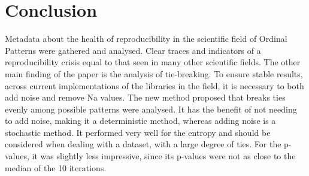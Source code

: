 \chapter{Conclusion}
Metadata about the health of reproducibility in the scientific field of Ordinal Patterns were gathered and analysed. Clear traces and indicators of a reproducibility crisis equal to that seen in many other scientific fields. The other main finding of the paper is the analysis of tie-breaking. To ensure stable results, across current implementations of the libraries in the field, it is necessary to both add noise and remove Na values. The new method proposed that breaks ties evenly among possible patterns were analysed. It has the benefit of not needing to add noise, making it a deterministic method, whereas adding noise is a stochastic method. It performed very well for the entropy and should be considered when dealing with a dataset, with a large degree of ties. For the p-values, it was slightly less impressive, since its p-values were not as close to the median of the 10 iterations. 